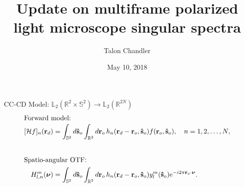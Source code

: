 \documentclass[presentation]{beamer}
\author{Talon Chandler}
\date{May 10, 2018}
\title{Update on multiframe polarized light microscope singular spectra}
\newcommand{\me}{\mathrm{e}}
\providecommand{\ro}[1]{\mathbf{\mathbf{r}}_o}
\providecommand{\so}[1]{\mathbf{\hat{s}}_o}
\providecommand{\rd}[1]{\mathbf{r}_d}
\providecommand{\mbb}[1]{\mathbb{#1}}
\providecommand{\bs}[1]{\boldsymbol{#1}}
\begin{document}
\maketitle

\begin{frame}{CC-CD Model: $\mbb{L}_2(\mbb{R}^2 \times \mbb{S}^2) \rightarrow \mbb{L}_2(\mbb{R}^{2N})$}
  \vspace{-2em}
  \begin{align*}
    \intertext{Forward model:}
    [\mathcal{H}f]_n(\rd{}) &= \int_{\mbb{S}^2}d\so{}\int_{\mbb{R}^2}d\ro{}\, h_n(\rd{}- \ro{}, \so{})f(\ro{}, \so{}),\quad  n=1, 2,\ldots,N,\\[2em]
    \intertext{Spatio-angular OTF:}
    H_{l,n}^{m}(\bs{\nu}) &= \int_{\mbb{S}^2}d\so{}\int_{\mbb{R}^2}d\ro{}\, h_n(\rd{}- \ro{}, \so{})y_l^m(\so{})\me^{-i 2\pi\ro{}\cdot\bs{\nu}}.
  \end{align*}
\end{frame}
\end{document}
